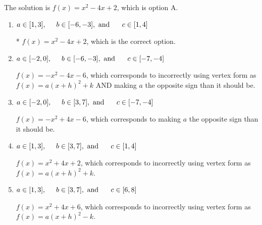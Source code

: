 \documentclass{extbook}[14pt]
\begin{document}
\begin{enumerate}
{The solution is \( f(x) = x^{2} -4 x + 2 \), which is option A.\begin{enumerate}[label=\Alph*.]
\item \( a \in [1, 3], \hspace*{5mm} b \in [-6, -3], \text{ and } \hspace*{5mm} c \in [1, 4] \)

* $f(x)=x^{2} -4 x + 2$, which is the correct option.
\item \( a \in [-2, 0], \hspace*{5mm} b \in [-6, -3], \text{ and } \hspace*{5mm} c \in [-7, -4] \)

$f(x)=-x^{2} -4 x -6$, which corresponds to incorrectly using vertex form as $f(x) = a(x+h)^2+k$ AND making $a$ the opposite sign than it should be.
\item \( a \in [-2, 0], \hspace*{5mm} b \in [3, 7], \text{ and } \hspace*{5mm} c \in [-7, -4] \)

$f(x)=-x^{2} +4 x -6$, which corresponds to making $a$ the opposite sign than it should be.
\item \( a \in [1, 3], \hspace*{5mm} b \in [3, 7], \text{ and } \hspace*{5mm} c \in [1, 4] \)

$f(x)=x^{2} +4 x + 2$, which corresponds to incorrectly using vertex form as $f(x) = a(x+h)^2+k$.
\item \( a \in [1, 3], \hspace*{5mm} b \in [3, 7], \text{ and } \hspace*{5mm} c \in [6, 8] \)

$f(x)=x^{2} +4 x + 6$, which corresponds to incorrectly using vertex form as $f(x) = a(x+h)^2 - k$.
\end{enumerate}

}
\end{enumerate}
\end{document}
